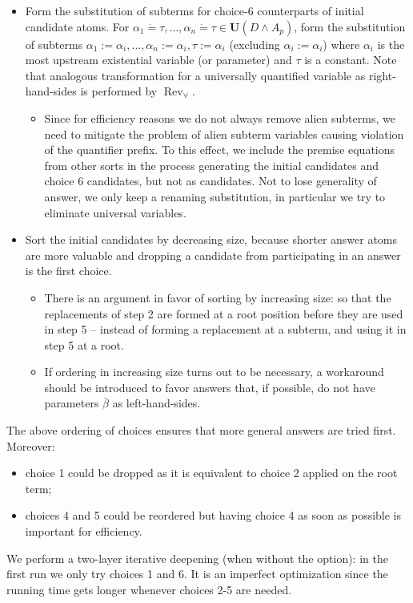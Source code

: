 \documentclass{article}
\newcommand{\assign}{:=}
\newcommand{\tmmathbf}[1]{\ensuremath{\boldsymbol{#1}}}
\newcommand{\tmop}[1]{\ensuremath{\operatorname{#1}}}
\newcommand{\tmverbatim}[1]{{\ttfamily{#1}}}
\begin{document}
\begin{itemize}
  \item Form the substitution of subterms for choice-6 counterparts of initial
  candidate atoms. For $\alpha_1 \dot{=} \tau, \ldots, \alpha_n \dot{=} \tau
  \in \tmmathbf{U} (D \wedge A_p)$, form the substitution of subterms
  $\alpha_1 \assign \alpha_i, \ldots, \alpha_n \assign \alpha_i, \tau \assign
  \alpha_i$ (excluding $\alpha_i \assign \alpha_i$) where $\alpha_i$ is the
  most upstream existential variable (or parameter) and $\tau$ is a constant.
  Note that analogous transformation for a universally quantified variable as
  right-hand-sides is performed by $\tmop{Rev}_{\forall}$.
  \begin{itemize}
    \item Since for efficiency reasons we do not always remove alien subterms,
    we need to mitigate the problem of alien subterm variables causing
    violation of the quantifier prefix. To this effect, we include the premise
    equations from other sorts in the process generating the initial
    candidates and choice 6 candidates, but not as candidates. Not to lose
    generality of answer, we only keep a renaming substitution, in particular
    we try to eliminate universal variables.
  \end{itemize}
  \item Sort the initial candidates by decreasing size, because shorter answer
  atoms are more valuable and dropping a candidate from participating in an
  answer is the first choice.
  \begin{itemize}
    \item There is an argument in favor of sorting by increasing size: so that
    the replacements of step 2 are formed at a root position before they are
    used in step 5 -- instead of forming a replacement at a subterm, and using
    it in step 5 at a root.
    
    \item If ordering in increasing size turns out to be necessary, a
    workaround should be introduced to favor answers that, if possible, do not
    have parameters $\bar{\beta}$ as left-hand-sides.
  \end{itemize}
\end{itemize}
The above ordering of choices ensures that more general answers are tried
first. Moreover:
\begin{itemize}
  \item choice 1 could be dropped as it is equivalent to choice 2 applied on
  the root term;
  
  \item choices 4 and 5 could be reordered but having choice 4 as soon as
  possible is important for efficiency.
\end{itemize}
We perform a two-layer iterative deepening (when without the
\tmverbatim{-more\_general} option): in the first run we only try choices 1
and 6. It is an imperfect optimization since the running time gets longer
whenever choices 2-5 are needed.
\end{document}
